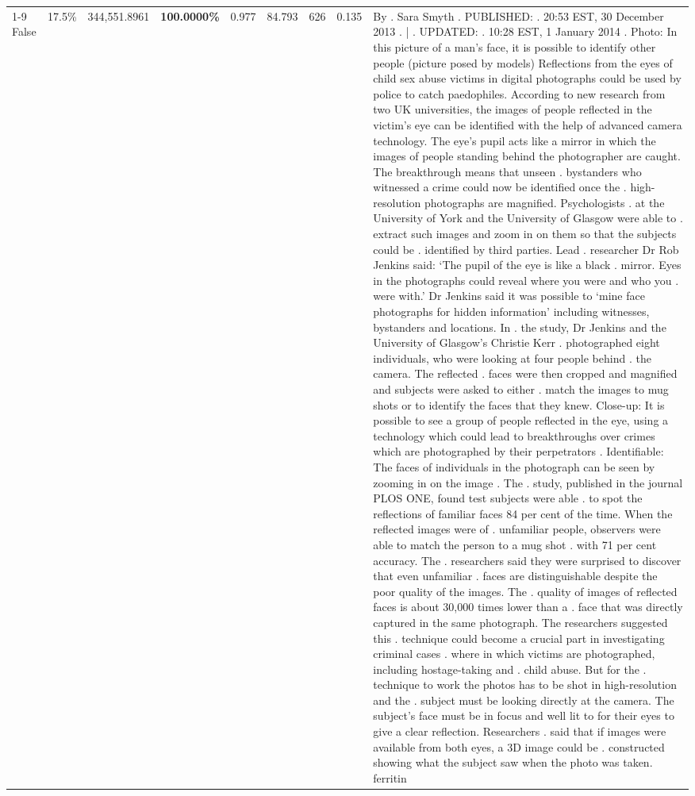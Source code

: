 \begin{table}[H]
\begin{tabular}{lllrlllll}
\cline{1-9} \cline{2-9}
False & 17.5\% & 344,551.8961 & \bfseries \color{red} 100.0000\% & 0.977 & 84.793 & 626 & 0.135 & By . Sara Smyth . PUBLISHED: . 20:53 EST, 30 December 2013 . | . UPDATED: . 10:28 EST, 1 January 2014 . Photo: In this picture of a man's face, it is possible to identify other people (picture posed by models) Reflections from the eyes of child sex abuse victims in digital photographs could be used by police to catch paedophiles. According to new research from two UK universities, the images of people reflected in the victim's eye can be identified with the help of advanced camera technology. The eye's pupil acts like a mirror in which the images of people standing behind the photographer are caught. The breakthrough means that unseen . bystanders who witnessed a crime could now be identified once the . high-resolution photographs are magnified. Psychologists . at the University of York and the University of Glasgow were able to . extract such images and zoom in on them so that the subjects could be . identified by third parties. Lead . researcher Dr Rob Jenkins said: ‘The pupil of the eye is like a black . mirror. Eyes in the photographs could reveal where you were and who you . were with.' Dr Jenkins said it was possible to ‘mine face photographs for hidden information' including witnesses, bystanders and locations. In . the study, Dr Jenkins and the University of Glasgow's Christie Kerr . photographed eight individuals, who were looking at four people behind . the camera. The reflected . faces were then cropped and magnified and subjects were asked to either . match the images to mug shots or to identify the faces that they knew. Close-up: It is possible to see a group of people reflected in the eye, using a technology which could lead to breakthroughs over crimes which are photographed by their perpetrators . Identifiable: The faces of individuals in the photograph can be seen by zooming in on the image . The . study, published in the journal PLOS ONE, found test subjects were able . to spot the reflections of familiar faces 84 per cent of the time. When the reflected images were of . unfamiliar people, observers were able to match the person to a mug shot . with 71 per cent accuracy. The . researchers said they were surprised to discover that even unfamiliar . faces are distinguishable despite the poor quality of the images. The . quality of images of reflected faces is about 30,000 times lower than a . face that was directly captured in the same photograph. The researchers suggested this . technique could become a crucial part in investigating criminal cases . where in which victims are photographed, including hostage-taking and . child abuse. But for the . technique to work the photos has to be shot in high-resolution and the . subject must be looking directly at the camera. The subject's face must be in focus and well lit to for their eyes to give a clear reflection. Researchers . said that if images were available from both eyes, a 3D image could be . constructed showing what the subject saw when the photo was taken. ferritin \\

\end{tabular}
\end{table}
